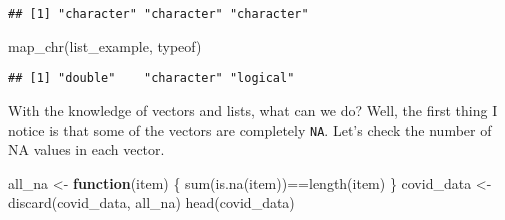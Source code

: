 \documentclass[
]{book}
\newenvironment{Shaded}{\begin{snugshade}}{\end{snugshade}}
\newcommand{\ControlFlowTok}[1]{\textcolor[rgb]{0.13,0.29,0.53}{\textbf{#1}}}
\newcommand{\FunctionTok}[1]{\textcolor[rgb]{0.00,0.00,0.00}{#1}}
\newcommand{\NormalTok}[1]{#1}
\newcommand{\OtherTok}[1]{\textcolor[rgb]{0.56,0.35,0.01}{#1}}
\newcommand{\SpecialCharTok}[1]{\textcolor[rgb]{0.00,0.00,0.00}{#1}}
\begin{document}
\begin{verbatim}
## [1] "character" "character" "character"
\end{verbatim}

\begin{Shaded}
\begin{Highlighting}[]
\FunctionTok{map\_chr}\NormalTok{(list\_example, typeof)}
\end{Highlighting}
\end{Shaded}

\begin{verbatim}
## [1] "double"    "character" "logical"
\end{verbatim}

With the knowledge of vectors and lists, what can we do? Well, the first thing I notice is that some of the vectors are completely \texttt{NA}. Let's check the number of NA values in each vector.

\begin{Shaded}
\begin{Highlighting}[]
\NormalTok{all\_na }\OtherTok{\textless{}{-}} \ControlFlowTok{function}\NormalTok{(item) \{}
  \FunctionTok{sum}\NormalTok{(}\FunctionTok{is.na}\NormalTok{(item))}\SpecialCharTok{==}\FunctionTok{length}\NormalTok{(item) }
\NormalTok{\}}
\NormalTok{covid\_data }\OtherTok{\textless{}{-}} \FunctionTok{discard}\NormalTok{(covid\_data, all\_na)}
\FunctionTok{head}\NormalTok{(covid\_data)}
\end{Highlighting}
\end{Shaded}
\end{document}

